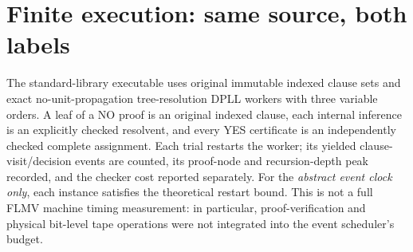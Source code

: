 \documentclass[11pt]{article}
\begin{document}
\section{Finite execution: same source, both labels}
The standard-library executable uses original immutable indexed clause sets and exact no-unit-propagation tree-resolution DPLL workers with three variable orders. A leaf of a NO proof is an original indexed clause, each internal inference is an explicitly checked resolvent, and every YES certificate is an independently checked complete assignment. Each trial restarts the worker; its yielded clause-visit/decision events are counted, its proof-node and recursion-depth peak recorded, and the checker cost reported separately. For the \emph{abstract event clock only}, each instance satisfies the theoretical restart bound. This is not a full FLMV machine timing measurement: in particular, proof-verification and physical bit-level tape operations were not integrated into the event scheduler's budget.
\end{document}
